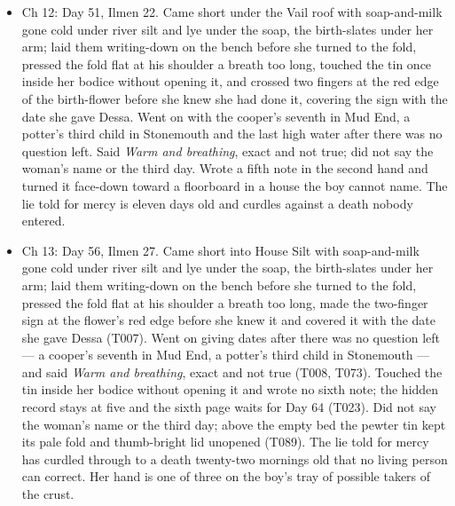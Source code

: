 \documentclass{design/chronicle}
\begin{document}
{\begin{itemize}[leftmargin=1.4em,itemsep=1pt,topsep=3pt,parsep=0pt]
\item Ch 12: Day 51, Ilmen 22. Came short under the Vail roof with soap-and-milk gone cold under river silt and lye under the soap, the birth-slates under her arm; laid them writing-down on the bench before she turned to the fold, pressed the fold flat at his shoulder a breath too long, touched the tin once inside her bodice without opening it, and crossed two fingers at the red edge of the birth-flower before she knew she had done it, covering the sign with the date she gave Dessa. Went on with the cooper’s seventh in Mud End, a potter’s third child in Stonemouth and the last high water after there was no question left. Said \emph{Warm and breathing}, exact and not true; did not say the woman’s name or the third day. Wrote a fifth note in the second hand and turned it face-down toward a floorboard in a house the boy cannot name. The lie told for mercy is eleven days old and curdles against a death nobody entered.

\end{itemize}

\begin{itemize}[leftmargin=1.4em,itemsep=1pt,topsep=3pt,parsep=0pt]

\item Ch 13: Day 56, Ilmen 27. Came short into House Silt with soap-and-milk gone cold under river silt and lye under the soap, the birth-slates under her arm; laid them writing-down on the bench before she turned to the fold, pressed the fold flat at his shoulder a breath too long, made the two-finger sign at the flower’s red edge before she knew it and covered it with the date she gave Dessa (T007). Went on giving dates after there was no question left --- a cooper’s seventh in Mud End, a potter’s third child in Stonemouth --- and said \emph{Warm and breathing}, exact and not true (T008, T073). Touched the tin inside her bodice without opening it and wrote no sixth note; the hidden record stays at five and the sixth page waits for Day 64 (T023). Did not say the woman’s name or the third day; above the empty bed the pewter tin kept its pale fold and thumb-bright lid unopened (T089). The lie told for mercy has curdled through to a death twenty-two mornings old that no living person can correct. Her hand is one of three on the boy’s tray of possible takers of the crust.

\end{itemize}

\begin{itemize}[leftmargin=1.4em,itemsep=1pt,topsep=3pt,parsep=0pt]


\end{itemize}}
\end{document}
